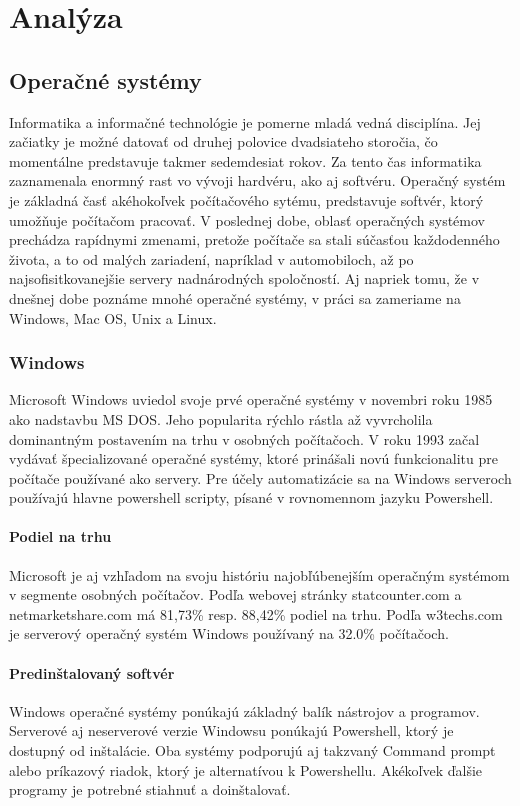 \section{Analýza}
\subsection{Operačné systémy}
\indent Informatika a informačné technológie je pomerne mladá vedná disciplína. Jej začiatky je možné datovať od druhej polovice dvadsiateho storočia, čo momentálne predstavuje takmer sedemdesiat rokov. Za tento čas informatika zaznamenala enormný rast vo vývoji hardvéru, ako aj softvéru.  Operačný systém je základná časť akéhokoľvek počítačového sytému, predstavuje softvér, ktorý umožňuje počítačom pracovať. V poslednej dobe, oblasť operačných systémov  prechádza rapídnymi zmenami, pretože počítače sa stali súčasťou každodenného života, a to od malých zariadení, napríklad v automobiloch, až po najsofisitkovanejšie servery nadnárodných spoločností. Aj napriek tomu, že v dnešnej dobe poznáme mnohé operačné systémy, v práci sa zameriame na Windows, Mac OS, Unix a Linux.\cite{osbook}

\subsubsection{Windows}
\indent Microsoft Windows uviedol svoje prvé operačné systémy v novembri roku 1985 ako nadstavbu MS DOS. Jeho popularita rýchlo rástla až vyvrcholila dominantným postavením na trhu v osobných počítačoch. V roku 1993 začal vydávať špecializované operačné systémy, ktoré prinášali novú funkcionalitu pre počítače používané ako servery.\cite{windowsHistory} Pre účely automatizácie sa na Windows serveroch používajú hlavne powershell scripty, písané v rovnomennom jazyku Powershell\cite{winAutomation}.
\paragraph{Podiel na trhu}
\indent Microsoft je aj vzhľadom na svoju históriu najobľúbenejším operačným systémom v segmente osobných počítačov. Podľa webovej stránky statcounter.com\cite{statcounter} a netmarketshare.com\cite{netmarketshare} má 81,73\%  \gls{resp.}  88,42\% podiel na trhu.
\newline
\indent Podľa w3techs.com\cite{pop} je serverový operačný systém Windows používaný na 32.0\% počítačoch.
\paragraph{Predinštalovaný softvér}
\indent Windows operačné systémy ponúkajú základný balík nástrojov a programov. Serverové aj neserverové verzie Windowsu ponúkajú  Powershell, ktorý je dostupný od inštalácie.  Oba systémy podporujú aj takzvaný Command prompt alebo príkazový riadok, ktorý je alternatívou k Powershellu. Akékoľvek ďalšie programy je potrebné stiahnuť a doinštalovať.

